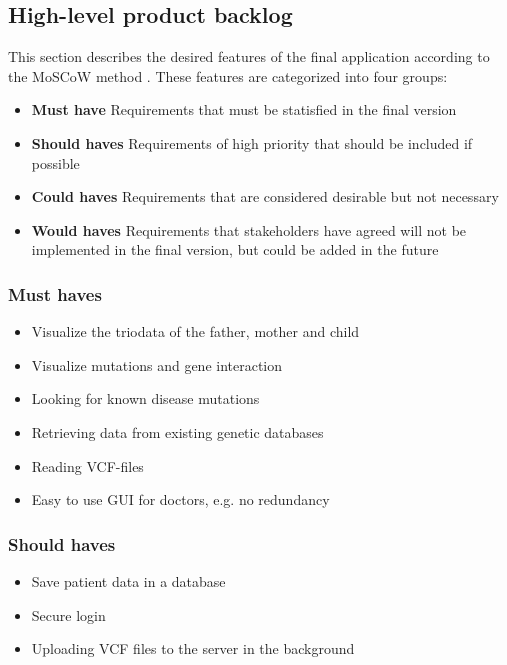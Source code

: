 \subsection{High-level product backlog}
	This section describes the desired features of the final application according to the MoSCoW method \cite{brennan2009guide}. These features are categorized into four groups:
	
	\begin{itemize}
		\item \textbf{Must have} 
			\subitem Requirements that must be statisfied in the final version
		\item \textbf{Should haves} 
			\subitem Requirements of high priority that should be included if possible
		\item \textbf{Could haves} 
			\subitem Requirements that are considered desirable but not necessary
		\item \textbf{Would haves} 
			\subitem Requirements that stakeholders have agreed will not be implemented in the final version, but could be added in the future
	\end{itemize}
	
	\subsubsection{Must haves}
		\begin{itemize}
			\item Visualize the triodata of the father, mother and child
			\item Visualize mutations and gene interaction
			\item Looking for known disease mutations
			\item Retrieving data from existing genetic databases
			\item Reading VCF-files
			\item Easy to use GUI for doctors, e.g. no redundancy
		\end{itemize}
	
	\subsubsection{Should haves}
		\begin{itemize}
			\item Save patient data in a database
			\item Secure login
			\item Uploading VCF files to the server in the background
		\end{itemize}
	
